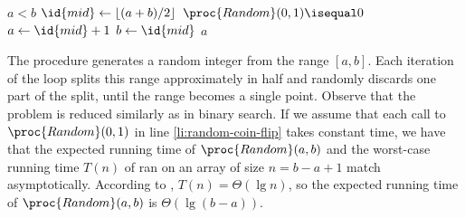 \starred
\indent\begin{codebox}
\li \While $a<b$
\li     \Do $\id{mid}\gets\lfloor(a+b)/2\rfloor$
\li         \If $\proc{Random}(0,1)\isequal0$ \label{li:random-coin-flip}
\li             \Then $a\gets\id{mid}+1$
\li             \Else $b\gets\id{mid}$
                \End
        \End
\li \Return $a$
\end{codebox}

The procedure generates a random integer from the range $[a,b]$.
Each iteration of the  loop splits this range approximately in half and randomly discards one part of the split, until the range becomes a single point.
Observe that the problem is reduced similarly as in binary search.
If we assume that each call to $\proc{Random}(0,1)$ in line \ref{li:random-coin-flip} takes constant time, we have that the expected running time of $\proc{Random}(a,b)$ and the worst-case running time $T(n)$ of  ran on an array of size $n=b-a+1$ match asymptotically.
According to , $T(n)=\Theta(\lg n)$, so the expected running time of $\proc{Random}(a,b)$ is $\Theta(\lg(b-a))$.
